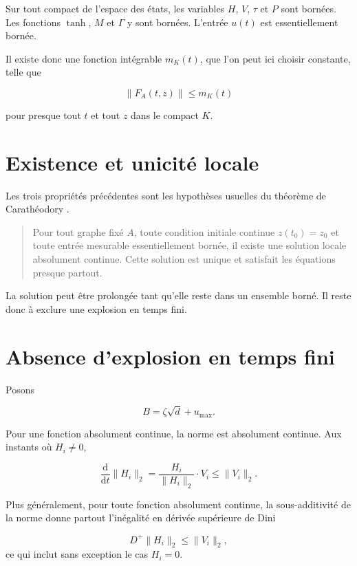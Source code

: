 Sur tout compact de l'espace des états, les variables \(H\), \(V\),
\(\tau\) et \(P\) sont bornées. Les fonctions \(\tanh\), \(M\) et
\(\Gamma\) y sont bornées. L'entrée \(u(t)\) est essentiellement
bornée.

Il existe donc une fonction intégrable \(m_K(t)\), que l'on peut ici
choisir constante, telle que

\[
\|F_A(t,z)\|
\leq
m_K(t)
\]

pour presque tout \(t\) et tout \(z\) dans le compact \(K\).

\section{Existence et unicité locale}
\label{annexe-existence-locale}

Les trois propriétés précédentes sont les hypothèses usuelles du
théorème de Carathéodory
\cite{filippov1988differential}.

\begin{quote}
Pour tout graphe fixé \(A\), toute condition initiale continue
\(z(t_0)=z_0\) et toute entrée mesurable essentiellement bornée, il
existe une solution locale absolument continue. Cette solution est
unique et satisfait les équations presque partout.
\end{quote}

La solution peut être prolongée tant qu'elle reste dans un ensemble
borné. Il reste donc à exclure une explosion en temps fini.

\section{Absence d'explosion en temps fini}
\label{annexe-existence-non-explosion}

Posons

\[
B=\zeta\sqrt d+u_{\max}.
\]

Pour une fonction absolument continue, la norme est absolument
continue. Aux instants où \(H_i\neq0\),

\[
\frac{\mathrm d}{\mathrm dt}\|H_i\|_2
=
\frac{H_i}{\|H_i\|_2}\cdot V_i
\leq
\|V_i\|_2.
\]

Plus généralement, pour toute fonction absolument continue, la
sous-additivité de la norme donne partout l'inégalité en dérivée
supérieure de Dini

\[
D^+\|H_i\|_2\leq\|V_i\|_2,
\]
ce qui inclut sans exception le cas \(H_i=0\).

